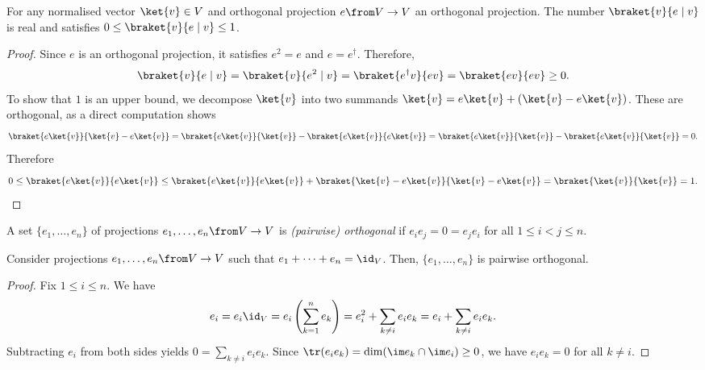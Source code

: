 \documentclass[a4paper,oneside, 12pt]{amsart}
\begin{document}
\begin{lemma}\label{lem:orthogonal-projections-and-probabilities}
  For any normalised vector \(\ket{v} \in V\) and orthogonal projection \(e \from V \to V\) an orthogonal projection.
  The number \(\braket{v}{e \mid v}\) is real and satisfies \(0 \leq \braket{v}{e \mid v}\leq 1\).
\end{lemma}
\begin{proof}
  Since \( e \) is an orthogonal projection, it satisfies \( e^2 = e \) and \( e = e^\dagger \).
  Therefore,
  \begin{equation*}
    \braket{v}{e \mid v} = \braket{v}{e^2 \mid v} = \braket{e^\dagger v}{e v} = \braket{e v}{e v} \geq 0.
  \end{equation*}
  To show that \(1\) is an upper bound, we decompose \( \ket{v} \) into two summands \( \ket{v} = e\ket{v} + (\ket{v} - e\ket{v}) \).
  These are orthogonal, as a direct computation shows
  \begin{equation*}
    \braket{e\ket{v}}{\ket{v} - e\ket{v}} = \braket{e\ket{v}}{\ket{v}} - \braket{e\ket{v}}{e\ket{v}} = \braket{e\ket{v}}{\ket{v}} - \braket{e\ket{v}}{\ket{v}} = 0.
  \end{equation*}
  Therefore
  \begin{equation*}
      0 \leq \braket{e\ket{v}}{e\ket{v}} \leq \braket{e\ket{v}}{e\ket{v}} + \braket{\ket{v} - e\ket{v}}{\ket{v} - e\ket{v}} = \braket{\ket{v}}{\ket{v}} = 1. \qedhere
  \end{equation*}
\end{proof}

\begin{definition}\label{def:orthogonal-idempotent}
  A set \(\{e_{1}, \dots , e_{n}\}\) of projections \(e_{1}, \dots , e_{n} \from V\to V\) is \emph{(pairwise) orthogonal} if \(e_{i}e_{j} = 0 =  e_{j}e_{i}\) for all \(1\leq i< j \leq n\).
\end{definition}

\begin{lemma}\label{lem:part-of-1-means-orth}
  Consider projections  \(e_{1}, \dots , e_{n} \from V\to V\) such that \(e_{1} + \dots + e_{n} = \id_{V}\).
  Then,  \(\{e_{1}, \dots , e_{n}\}\) is pairwise orthogonal.
\end{lemma}
\begin{proof}
  Fix \(1\leq i \leq n\).
  We have
  \begin{equation*}
    e_i = e_i \id_V = e_i \left( \sum_{k=1}^n e_k \right) = e_i^2 + \sum_{k \neq i} e_i e_k = e_i + \sum_{k \neq i} e_i e_k.
  \end{equation*}
  Subtracting \( e_i \) from both sides yields \(0 = \sum_{k \neq i} e_i e_k\).
  Since \(\tr(e_{i} e_{k}) = \dim (\im e_{k} \cap \im e_{i})\geq 0\), we have \(e_i e_k = 0\) for all \( k \neq i \).
\end{proof}
\end{document}
